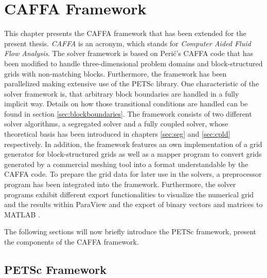 \chapter{CAFFA Framework}
\label{sec:caffa}

This chapter presents the CAFFA framework that has been extended for the present thesis. \emph{CAFFA} is an acronym, which stands for \emph{Computer Aided Fluid Flow Analysis}. The solver framework is based on Peri\'c's CAFFA code \cite{ferziger02} that has been modified to handle three-dimensional problem domains and block-structured grids with non-matching blocks. Furthermore, the framework has been parallelized making extensive use of the PETSc library. One characteristic of the solver framework is, that arbitrary block boundaries are handled in a fully implicit way. Details on how those transitional conditions are handled can be found in section \ref{sec:blockboundaries}. The framework consists of two different solver algorithms, a segregated solver and a fully coupled solver, whose theoretical basis has been introduced in chapters \ref{sec:seg} and \ref{sec:cpld} respectively. In addition, the framework features an own implementation of a grid generator for block-structured grids as well as a mapper program to convert grids generated by a commercial meshing tool into a format understandable by the CAFFA code. To prepare the grid data for later use in the solvers, a preprocessor program has been integrated into the framework. Furthermore, the solver programs exhibit different export functionalities to visualize the numerical grid and the results within ParaView \cite{paraview} and the export of binary vectors and matrices to MATLAB \textregistered \cite{matlab}.

The following sections will now briefly introduce the PETSc framework, present the components of the CAFFA framework.

\section{PETSc Framework}
\label{sec:petsc}

